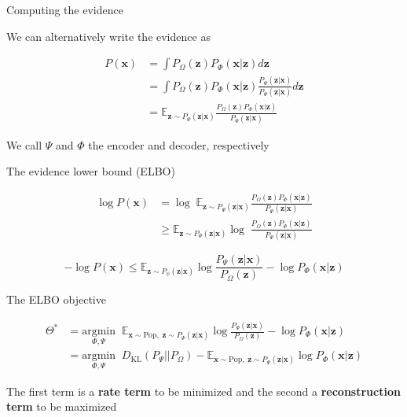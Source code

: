 \documentclass{beamer}					%
\begin{document}
\begin{frame}{Computing the evidence}

We can alternatively write the evidence as

\begin{align*}
P(\mathbf{x}) &= \int P_{\Omega}(\mathbf{z})P_{\Phi}(\mathbf{x|z})d\mathbf{z}\\
&= \int P_{\Omega}(\mathbf{z})P_{\Phi}(\mathbf{x|z})\frac{P_{\Psi}(\mathbf{z|x})}{P_{\Psi}(\mathbf{z|x})}d\mathbf{z}\\
&= \mathbb{E}_{\mathbf{z}\sim P_{\Psi}(\mathbf{z|x})} \frac{P_{\Omega}(\mathbf{z})P_{\Phi}(\mathbf{x|z})}{P_{\Psi}(\mathbf{z|x})}
\end{align*}

We call $\Psi$ and $\Phi$ the encoder and decoder, respectively

\end{frame}

\begin{frame}{The evidence lower bound (ELBO)}

\begin{align*}
\log P(\mathbf{x}) &= \log \;\mathbb{E}_{\mathbf{z}\sim P_{\Psi}(\mathbf{z|x})} \frac{P_{\Omega}(\mathbf{z})P_{\Phi}(\mathbf{x|z})}{P_{\Psi}(\mathbf{z|x})}\\
&\geq \mathbb{E}_{\mathbf{z}\sim  P_{\Psi}(\mathbf{z|x})} \log \;\frac{P_{\Omega}(\mathbf{z})P_{\Phi}(\mathbf{x|z})}{P_{\Psi}(\mathbf{z|x})}
\end{align*}

\begin{equation*}
-\log P(\mathbf{x}) \leq \mathbb{E}_{\mathbf{z}\sim P_{\phi}(\mathbf{z|x})} \log \frac{P_{\Psi}(\mathbf{z|x})}{P_{\Omega}(\mathbf{z})} - \log P_{\Phi}(\mathbf{x|z})
\end{equation*}


\end{frame}

\begin{frame}{The ELBO objective}


\begin{align*}
\Theta^{*} &= \underset{\Phi,\Psi}{\mathrm{argmin}} \;\;\mathbb{E}_{\mathbf{x}\sim \mathrm{Pop},\; \mathbf{z}\sim P_{\Psi}(\mathbf{\mathbf{z}|\mathbf{x}})} \log \frac{P_{\Psi}(\mathbf{z|x})}{P_{\Omega}(\mathbf{z})} - \log P_{\Phi}(\mathbf{x|z})\\
&= \underset{\Phi,\Psi}{\mathrm{argmin}} \;\; D_{\mathrm{KL}}\left(P_{\Psi}||P_{\Omega}\right) - \mathbb{E}_{\mathbf{x}\sim \mathrm{Pop},\;\mathbf{z}\sim P_{\Psi}(\mathbf{\mathbf{z}|\mathbf{x}})}  \log P_{\Phi}(\mathbf{x|z})
\end{align*}

\vspace{0.1in}
The first term is a \textbf{rate term} to be minimized and the second a \textbf{reconstruction term} to be maximized

\end{frame}
\end{document}

